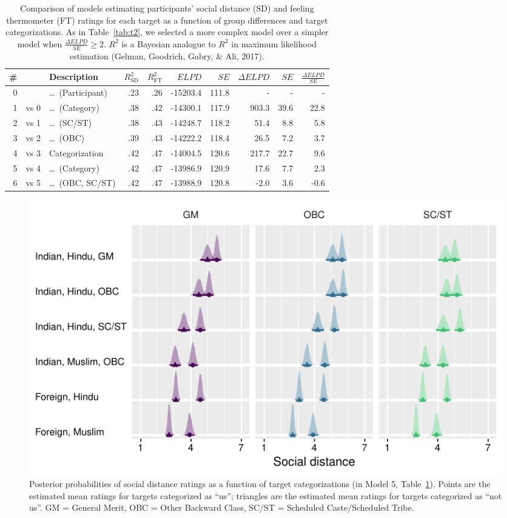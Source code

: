 \documentclass[12pt, a4paper]{article}
\begin{document}
\begin{table}
\caption{Comparison of models estimating participants' social distance (SD) and feeling thermometer (FT) ratings for each target as a function of group differences and target categorizations. As in Table~\ref{tab:t2}, we selected a more complex model over a simpler model when $\frac{\Delta\textit{ELPD}}{\textit{SE}} \geq 2$. $R^2$ is a Bayesian analogue to $R^2$ in maximum likelihood estimation (Gelman, Goodrich, Gabry, \& Ali, 2017).}
\centering
{}
\small	
\begin{tabularx}{\linewidth}{r@{~}rXrrrrrrr} \toprule
\# &  & Description & $R^2_\text{SD}$ & $R^2_\text{FT}$ & $\textit{ELPD}$ & $\textit{SE}$ & $\Delta\textit{ELPD}$ & $\textit{SE}$ & $\frac{\Delta\textit{ELPD}}{\textit{SE}}$ \\ \midrule 
0 &      & \ldots~(Participant) & .23 & .26 & -15203.4 & 111.8 &     - &    - &    - \\
1 & vs 0 & \ldots~(Category)    & .38 & .42 & -14300.1 & 117.9 & 903.3 & 39.6 & 22.8 \\
2 & vs 1 & \ldots~(SC/ST)       & .38 & .43 & -14248.7 & 118.2 &  51.4 &  8.8 &  5.8 \\
3 & vs 2 & \ldots~(OBC)         & .39 & .43 & -14222.2 & 118.4 &  26.5 &  7.2 &  3.7 \\ \midrule
4 & vs 3 & Categorization       & .42 & .47 & -14004.5 & 120.6 & 217.7 & 22.7 &  9.6 \\
5 & vs 4 & \ldots~(Category)    & .42 & .47 & -13986.9 & 120.9 &  17.6 &  7.7 &  2.3 \\
6 & vs 5 & \ldots~(OBC, SC/ST)  & .42 & .47 & -13988.9 & 120.8 &  -2.0 &  3.6 & -0.6 \\
\bottomrule    
\end{tabularx}
\label{tab:t3}
\end{table}

\begin{figure}
\centering
\includegraphics[scale=1]{../figures/figure-5}
\caption{
Posterior probabilities of social distance ratings as a function of target categorizations (in Model 5, Table~\ref{tab:t3}). Points are the estimated mean ratings for targets categorized as ``us''; triangles are the estimated mean ratings for targets categorized as ``not us''. GM = General Merit, OBC = Other Backward Class, SC/ST = Scheduled Caste/Scheduled Tribe.
}
\label{fig:f5}
\end{figure}
\end{document}
